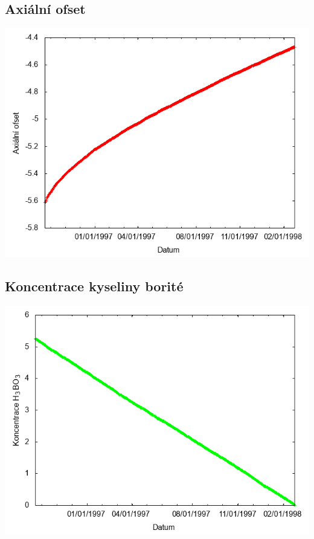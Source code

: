 \documentclass[a4paper,twoside,11pt]{article}
\begin{document}
\subsection*{Axiální ofset}
\begin{center}
\includegraphics[width=.8\textwidth]{graphs/Atlantis_17_ao.png}
\end{center}

\subsection*{Koncentrace kyseliny borité}
\begin{center}
\includegraphics[width=.8\textwidth]{graphs/Atlantis_17_bc.png}
\end{center}
\end{document}
